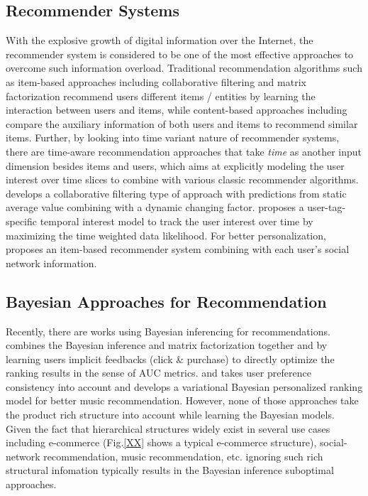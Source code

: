 \subsection{Recommender Systems}

With the explosive growth of digital information over the Internet, the recommender system is considered to be one of the most effective approaches to overcome such information overload. Traditional recommendation algorithms such as item-based approaches including collaborative filtering \cite{Sarwar:2001:ICF:371920.372071,Su:2009:SCF:1592474.1722966} and matrix factorization \cite{Rendle:2010:FPM} recommend users different items / entities by learning the interaction between users and items, while content-based approaches including \cite{2011rsh..book...73L,Liu:2011,Yuan:2015} compare the auxiliary information of both users and items to recommend similar items.  Further, by looking into time variant nature of recommender systems, there are time-aware recommendation approaches \cite{Gultekin_acollaborative,Tang_review:2013} that take \emph{time} as another input dimension besides items and users, which aims at explicitly modeling the user interest over time slices to combine with various classic recommender algorithms. \cite{Koren:2010} develops a collaborative filtering type of approach with predictions from static average value combining with a dynamic changing factor.  \cite{Yin:2011} proposes a user-tag-specific temporal interest model to track the user interest over time by maximizing the time weighted data likelihood.  For better personalization, \cite{Guy:2009} proposes an item-based recommender system combining with each user's social network information. 
\subsection{Bayesian Approaches for Recommendation}

Recently, there are works using Bayesian inferencing for recommendations. \cite{rendle2009bpr} combines the Bayesian inference and matrix factorization together and by learning users implicit feedbacks (click \& purchase) to directly optimize the ranking results in the sense of AUC metrics. \cite{Ben-Elazar:2017} and \cite{zhang2007efficient} takes user preference consistency into account and develops a variational Bayesian personalized ranking model for better music recommendation.  However, none of those approaches take the product rich structure into account while learning the Bayesian models.  Given the fact that hierarchical structures widely exist in several use cases including e-commerce (Fig.\ref{XX} shows a typical e-commerce structure), social-network recommendation, music recommendation, etc. ignoring such rich structural infomation typically results in the Bayesian inference suboptimal approaches.  

